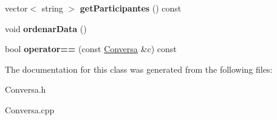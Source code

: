 \begin{DoxyCompactItemize}
\item 
\hypertarget{class_conversa_afe17736f50a6ab6b471be57c64da79dc}{}vector$<$ string $>$ {\bfseries get\+Participantes} () const \label{class_conversa_afe17736f50a6ab6b471be57c64da79dc}

\item 
\hypertarget{class_conversa_a8f575a8d5137b94f5190e85998b01b8d}{}void {\bfseries ordenar\+Data} ()\label{class_conversa_a8f575a8d5137b94f5190e85998b01b8d}

\item 
\hypertarget{class_conversa_a14487547f1756a0069393894dc6f326c}{}bool {\bfseries operator==} (const \hyperlink{class_conversa}{Conversa} \&c) const \label{class_conversa_a14487547f1756a0069393894dc6f326c}

\end{DoxyCompactItemize}


The documentation for this class was generated from the following files\+:\begin{DoxyCompactItemize}
\item 
Conversa.\+h\item 
Conversa.\+cpp\end{DoxyCompactItemize}
